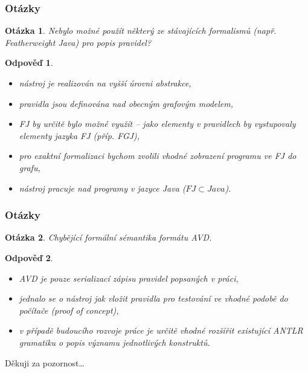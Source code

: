 \documentclass{beamer}
\newtheorem*{question}{Otázka}
\newtheorem*{response}{Odpověď}
\begin{document}
\begin{frame}
  \frametitle{Otázky}
  \begin{question}
    Nebylo možné použít některý ze stávajících formalismů (např. Featherweight Java) pro popis pravidel?
  \end{question}
  \begin{response}
    \begin{itemize}
    \item nástroj je realizován na vyšší úrovni abstrakce,
    \item pravidla jsou definována nad obecným grafovým modelem,
    \item FJ by určitě bylo možné využít -- jako elementy v pravidlech by vystupovaly elementy jazyka FJ (příp. FGJ),
    \item pro exaktní formalizaci bychom zvolili vhodné zobrazení programu ve FJ do grafu,
    \item nástroj pracuje nad programy v jazyce Java ($FJ \subset Java$).
    \end{itemize}
  \end{response}
\end{frame}

\begin{frame}
  \frametitle{Otázky}
  \begin{question}
    Chybějící formální sémantika formátu AVD.
  \end{question}
  \begin{response}
    \begin{itemize}
    \item AVD je pouze serializací zápisu pravidel popsaných v práci,
    \item jednalo se o nástroj jak vložit pravidla pro testování ve vhodné podobě do počítače (proof of concept),
    \item v případě budoucího rozvoje práce je určitě vhodné rozšířit existující ANTLR gramatiku o popis významu jednotlivých konstruktů.
    \end{itemize}
  \end{response}
\end{frame}

\begin{frame}
  \begin{center}
    {\huge Děkuji za pozornost\ldots}
  \end{center}
\end{frame}
\end{document}
